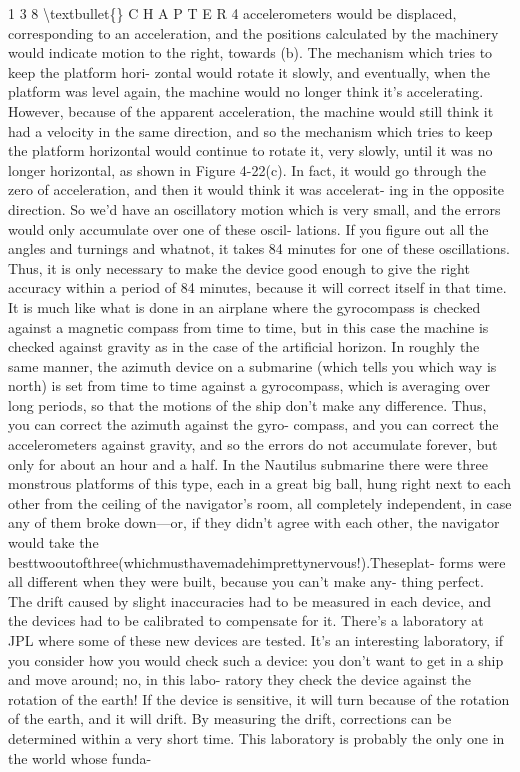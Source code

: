 \documentclass[10pt,oneside]{article}
\begin{document}
1 3 8 \textbackslash{}textbullet\{\} C H A P T E R  4 accelerometers would be displaced, corresponding to an acceleration, and the positions calculated by the machinery would indicate motion to the right, towards (b). The mechanism which tries to keep the platform hori- zontal would rotate it slowly, and eventually, when the platform was level again, the machine would no longer think it’s accelerating. However, because of the apparent acceleration, the machine would still think it had a velocity in the same direction, and so the mechanism which tries to keep the platform horizontal would continue to rotate it, very slowly, until it was no longer horizontal, as shown in Figure 4-22(c). In fact, it would go through the zero of acceleration, and then it would think it was accelerat- ing in the opposite direction. So we’d have an oscillatory motion which is very small, and the errors would only accumulate over one of these oscil- lations. If you figure out all the angles and turnings and whatnot, it takes 84 minutes for one of these oscillations. Thus, it is only necessary to make the device good enough to give the right accuracy within a period of 84 minutes, because it will correct itself in that time. It is much like what is done in an airplane where the gyrocompass is checked against a magnetic compass from time to time, but in this case the machine is checked against gravity as in the case of the artificial horizon. In roughly the same manner, the azimuth device on a submarine (which tells you which way is north) is set from time to time against a gyrocompass, which is averaging over long periods, so that the motions of the ship don’t make any difference. Thus, you can correct the azimuth against the gyro- compass, and you can correct the accelerometers against gravity, and so the errors do not accumulate forever, but only for about an hour and a half. In the Nautilus submarine there were three monstrous platforms of this type, each in a great big ball, hung right next to each other from the ceiling of the navigator’s room, all completely independent, in case any of them broke down---or, if they didn’t agree with each other, the navigator would take the besttwooutofthree(whichmusthavemadehimprettynervous!).Theseplat- forms were all different when they were built, because you can’t make any- thing perfect. The drift caused by slight inaccuracies had to be measured in each device, and the devices had to be calibrated to compensate for it. There’s a laboratory at JPL where some of these new devices are tested. It’s an interesting laboratory, if you consider how you would check such a device: you don’t want to get in a ship and move around; no, in this labo- ratory they check the device against the rotation of the earth! If the device is sensitive, it will turn because of the rotation of the earth, and it will drift. By measuring the drift, corrections can be determined within a very short time. This laboratory is probably the only one in the world whose funda-\par
\end{document}

